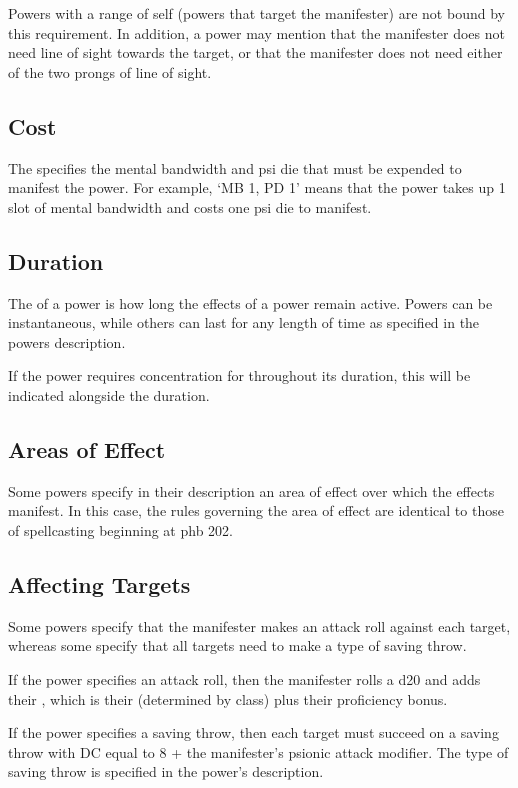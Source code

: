 Powers with a range of self (powers that target the manifester)
are not bound by this requirement.
In addition, a power may mention that the manifester does not need
line of sight towards the target,
or that the manifester does not need either of the
two prongs of line of sight. 

\subsection{Cost}
The  specifies the mental bandwidth and psi die
that must be expended to manifest the power.
For example,
`MB 1, PD 1'
means that the power takes up 1 slot of mental bandwidth
and costs one psi die to manifest.

\subsection{Duration}
The  of a power is how long the effects
of a power remain active.
Powers can be instantaneous,
while others can last for any length of time
as specified in the powers description.

If the power requires concentration for throughout its duration,
this will be indicated alongside the duration.

\subsection{Areas of Effect}
Some powers specify in their description an area of effect
over which the effects manifest.
In this case, the rules governing the area of effect
are identical to those of spellcasting beginning at
phb 202.

\subsection{Affecting Targets}
Some powers specify that the manifester makes an attack
roll against each target,
whereas some specify that all targets need to make
a type of saving throw.

If the power specifies an attack roll,
then the manifester rolls a d20
and adds their ,
which is their  (determined by class)
plus their proficiency bonus.

If the power specifies a saving throw,
then each target must succeed on a saving throw
with DC equal to 8 + the manifester's psionic attack modifier.
The type of saving throw
is specified in the power's description.

